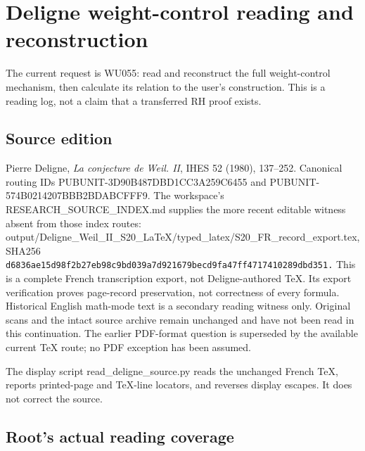 \documentclass[
]{report}
\begin{document}
\chapter{Deligne weight-control reading and
reconstruction}\label{deligne-weight-control-reading-and-reconstruction}

The current request is WU055: read and reconstruct the full
weight-control mechanism, then calculate its relation to the user's
construction. This is a reading log, not a claim that a transferred RH
proof exists.

\section{Source edition}\label{source-edition}

Pierre Deligne, \emph{La conjecture de Weil. II}, IHES 52 (1980),
137--252. Canonical routing IDs PUBUNIT-3D90B487DBD1CC3A259C6455 and
PUBUNIT-574B0214207BBB2BDABCFFF9. The workspace's
RESEARCH\_SOURCE\_INDEX.md supplies the more recent editable witness
absent from those index routes:
output/Deligne\_Weil\_II\_S20\_LaTeX/typed\_latex/S20\_FR\_record\_export.tex,
SHA256
\nolinkurl{d6836ae15d98f2b27eb98c9bd039a7d921679becd9fa47ff4717410289dbd351.}
This is a complete French transcription export, not Deligne-authored
TeX. Its export verification proves page-record preservation, not
correctness of every formula. Historical English math-mode text is a
secondary reading witness only. Original scans and the intact source
archive remain unchanged and have not been read in this continuation.
The earlier PDF-format question is superseded by the available current
TeX route; no PDF exception has been assumed.

The display script read\_deligne\_source.py reads the unchanged French
TeX, reports printed-page and TeX-line locators, and reverses display
escapes. It does not correct the source.

\section{Root's actual reading
coverage}\label{roots-actual-reading-coverage}
\end{document}
